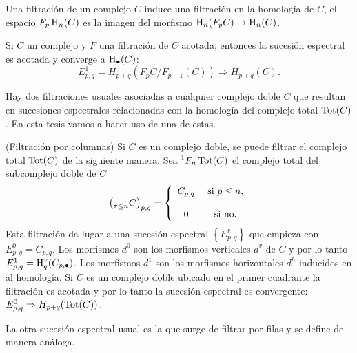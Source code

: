 \documentclass[a4paper,oneside,fleqn,11pt,../tesis.tex]{subfiles}
\begin{document}
Una filtración de un complejo $C$ induce una filtración en la homología de $C$, el espacio $F_p \operatorname{H}_{n}(C)$ es la imagen
del morfismo $\operatorname{H}_{n}(F_p C) \to \operatorname{H}_{n}(C)$.

\begin{Teorema}
    Si $C$ un complejo y $F$ una filtración de $C$ acotada, entonces la sucesión espectral es acotada y converge a $\operatorname{H}_{\bullet}(C)$:
    \[
        E_{p, q}^{1} = H_{p + q}(F_p C / F_{p - 1}(C)) \Rightarrow H_{p + q}(C).
    \]
\end{Teorema}

Hay dos filtraciones usuales asociadas a cualquier complejo doble $C$ que resultan en sucesiones espectrales relacionadas con la homología
del complejo total $\operatorname{Tot}(C)$. En esta tesis vamos a hacer uso de una de estas.

\begin{definition} (Filtración por columnas) Si $C$ es un complejo doble, se puede filtrar el complejo total $\operatorname{Tot}(C)$ de la siguiente manera. Sea $\prescript{1}{}{F_{n}}\operatorname{Tot}(C)$ el complejo total del subcomplejo doble de $C$
\[
	\left(\prescript{}{\tau \leq n}{C}\right)_{p, q} = \left\{\begin{array}{cc}
    C_{p, q} &\text{ si } p \leq n,\\
    &\\
    0 & \text{ si no}. \\
	\end{array}\right.
\]
Esta filtración da lugar a una sucesión espectral $\left\lbrace E_{p, q}^{r}\right\rbrace$ que empieza con $E_{p, q}^{0} = C_{p, q}$. Los morfismos
$d^{0}$ son los morfismos verticales $d^{v}$ de $C$ y por lo tanto $E^{1}_{p, q} = \operatorname{H}_{q}^{v}(C_{p, \bullet})$. Los morfismos $d^{1}$
son los morfismos horizontales $d^{h}$ inducidos en al homología. Si $C$ es un complejo doble ubicado en el primer cuadrante
la filtración es acotada y por lo tanto la sucesión espectral es convergente: $E_{p, q}^{0} \Rightarrow H_{p + q}(\operatorname{Tot}(C))$. 
\end{definition}

La otra sucesión espectral usual es la que surge de filtrar por filas y se define de manera análoga. 
\end{document}
